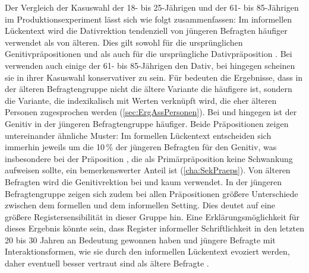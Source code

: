 Der Vergleich der Kasuswahl der 18- bis 25-Jährigen und der 61- bis 85-Jährigen im Produktionsexperiment lässt sich wie folgt zusammenfassen:
Im informellen Lückentext wird die Dativrektion tendenziell von jüngeren Befragten häufiger verwendet als von älteren. 
Dies gilt sowohl für die ursprünglichen Genitivpräpositionen \wegen{} und \waehrend{} als auch für die ursprüngliche Dativpräposition \dank. 
Bei \wegen{} verwenden auch einige der 61- bis 85-Jährigen den Dativ, bei \waehrend{} hingegen scheinen sie in ihrer Kasuswahl konservativer zu sein. 
Für \dank{} bedeuten die Ergebnisse, dass in der älteren Befragtengruppe nicht die ältere Variante die häufigere ist, sondern die Variante, die indexikalisch mit Werten verknüpft wird, die eher älteren Personen zugesprochen werden (\autoref{sec:ErgAssPersonen}).
Bei  und  hingegen ist der Genitiv in der jüngeren Befragtengruppe häufiger. 
Beide Präpositionen zeigen untereinander ähnliche Muster:
Im formellen Lückentext entscheiden sich immerhin jeweils um die 10\,\% der jüngeren Befragten für den Genitiv, was insbesondere bei der Präposition , die als Primärpräposition keine Schwankung aufweisen sollte, ein bemerkenswerter Anteil ist (\autoref{cha:SekPraeps}). 
Von älteren Befragten wird die Genitivrektion bei \gegenueber{} und  kaum verwendet. 
In der jüngeren Befragtengruppe zeigen sich zudem bei allen Präpositionen größere Unterschiede zwischen dem formellen und dem informellen Setting. 
Dies deutet auf eine größere Registersensibilität in dieser Gruppe hin. 
Eine Erklärungsmöglichkeit für dieses Ergebnis könnte sein, dass Register informeller Schriftlichkeit in den letzten 20 bis 30 Jahren an Bedeutung gewonnen haben und jüngere Befragte mit Interaktionsformen, wie sie durch den informellen Lückentext evoziert werden, daher eventuell besser vertraut sind als ältere Befragte \citep[s.][174--175]{Wolfer.2020}. 

